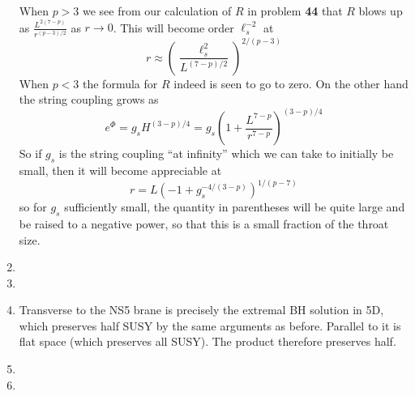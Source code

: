 \documentclass[11pt, class=article, crop=false]{standalone}
\begin{document}
\begin{enumerate}
	When $p > 3$ we see from our  calculation of $R$ in problem \textbf{44} that $R$ blows up as $\frac{L^{2(7-p)}}{r^{(p-3)/2}}$ as $r \to 0$. This will become order $\ell_s^{-2}$ at 
	\[
		r \approx \left(\frac{\ell_s^2}{L^{(7-p)/2}}\right)^{2/(p-3)}
	\]	
	When $p < 3$ the formula for $R$ indeed is seen to go to zero. On the other hand the string coupling grows as
	\[
		e^{\Phi} = g_s H^{(3-p)/4} = g_s \left(1 + \frac{L^{7-p}}{r^{7-p}} \right)^{(3-p)/4}
	\]
	So if $g_s$ is the string coupling ``at infinity'' which we can take to initially be small, then it will become appreciable at
	\[
		r = L (-1 + g_s^{-4/(3-p)})^{1/(p-7)}
	\]
	so for $g_s$ sufficiently small, the quantity in parentheses will be quite large and be raised to a negative power, so that this is a small fraction of the throat size. 
	
	\item
	
	\item
	
	\item Transverse to the NS5 brane is precisely the extremal BH solution in 5D, which preserves half SUSY by the same arguments as before. Parallel to it is flat space (which preserves all SUSY). The product therefore preserves half.
	
	\item 
	
	\item
	
		
\end{enumerate}

\end{document}
